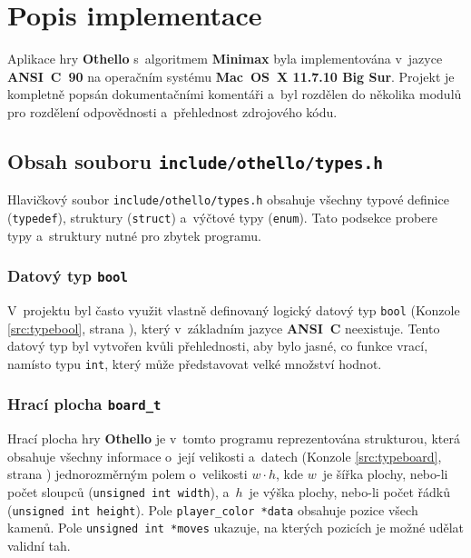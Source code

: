 \section{Popis implementace}

Aplikace hry \textbf{Othello} s~algoritmem \textbf{Minimax} byla implementována v~jazyce \textbf{ANSI~C~90} na operačním systému \textbf{Mac~OS~X 11.7.10 Big Sur}. Projekt je kompletně popsán dokumentačními komentáři a~byl rozdělen do několika modulů pro rozdělení odpovědnosti a~přehlednost zdrojového kódu.

\subsection{Obsah souboru \lstinline{include/othello/types.h}}

Hlavičkový soubor \lstinline{include/othello/types.h} obsahuje všechny typové definice (\lstinline{typedef}), struktury (\lstinline{struct}) a~výčtové typy (\lstinline{enum}). Tato podsekce probere typy a~struktury nutné pro zbytek programu.

\subsubsection{Datový typ \lstinline{bool}}

V~projektu byl často využit vlastně definovaný logický datový typ \lstinline{bool} (Konzole \ref{src:typebool}, strana \pageref{src:typebool}), který v~základním jazyce \textbf{ANSI~C} neexistuje. Tento datový typ byl vytvořen kvůli přehlednosti, aby bylo jasné, co funkce vrací, namísto typu \lstinline{int}, který může představovat velké množství hodnot.



\subsubsection{Hrací plocha \lstinline{board_t}}



Hrací plocha hry \textbf{Othello} je v~tomto programu reprezentována strukturou, která obsahuje všechny informace o~její velikosti a~datech (Konzole \ref{src:typeboard}, strana \pageref{src:typeboard}) jednorozměrným polem o~velikosti $w\cdot h$, kde $w$~je šířka plochy, nebo-li počet sloupců (\lstinline[style=source]{unsigned int width}), a~$h$~je výška plochy, nebo-li počet řádků (\lstinline[style=source]{unsigned int height}). Pole \lstinline[style=source]{player_color *data} obsahuje pozice všech kamenů. Pole \lstinline[style=source]{unsigned int *moves} ukazuje, na kterých pozicích je možné udělat validní tah.

